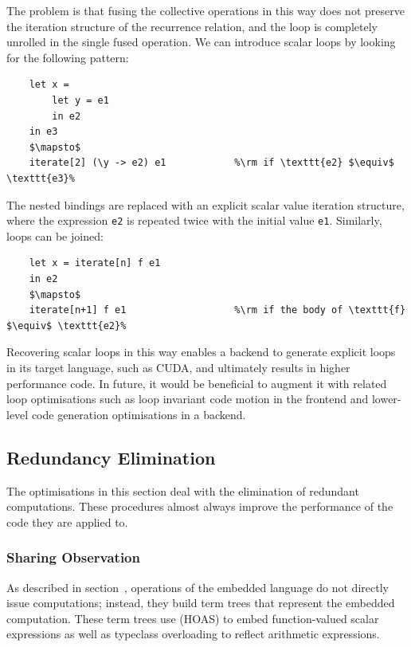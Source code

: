 The problem is that fusing the collective operations in this way does not
preserve the iteration structure of the recurrence relation, and the loop is
completely unrolled in the single fused operation. We can introduce scalar loops
by looking for the following pattern:
%
\begin{lstlisting}[style=Haskell,numbers=none,mathescape]
%\bf$\langle$ loop introduction $\rangle$%
    let x =
        let y = e1
        in e2
    in e3
    $\mapsto$
    iterate[2] (\y -> e2) e1            %\rm if \texttt{e2} $\equiv$ \texttt{e3}%
\end{lstlisting}
%
The nested bindings are replaced with an explicit scalar value iteration
structure, where the expression \texttt{e2} is repeated twice with the initial
value \texttt{e1}. Similarly, loops can be joined:
%
\begin{lstlisting}[style=Haskell,numbers=none,mathescape]
%\bf$\langle$ loop joining $\rangle$%
    let x = iterate[n] f e1
    in e2
    $\mapsto$
    iterate[n+1] f e1                   %\rm if the body of \texttt{f} $\equiv$ \texttt{e2}%
\end{lstlisting}
%
Recovering scalar loops in this way enables a backend to generate explicit loops
in its target language, such as CUDA, and ultimately results in higher
performance code. In future, it would be beneficial to augment it with related
loop optimisations such as loop invariant code motion in the frontend and
lower-level code generation optimisations in a backend.


\subsection{Redundancy Elimination}
\label{sec:redundancy_elimination}

The optimisations in this section deal with the elimination of redundant
computations. These procedures almost always improve the performance of the code
they are applied to.

\subsubsection{Sharing Observation}

As described in section~\derp, operations of the embedded language do not
directly issue computations; instead, they build term trees that represent
the embedded computation. These term trees use  (HOAS)
to embed function-valued scalar expressions as well as typeclass overloading to
reflect arithmetic expressions.

